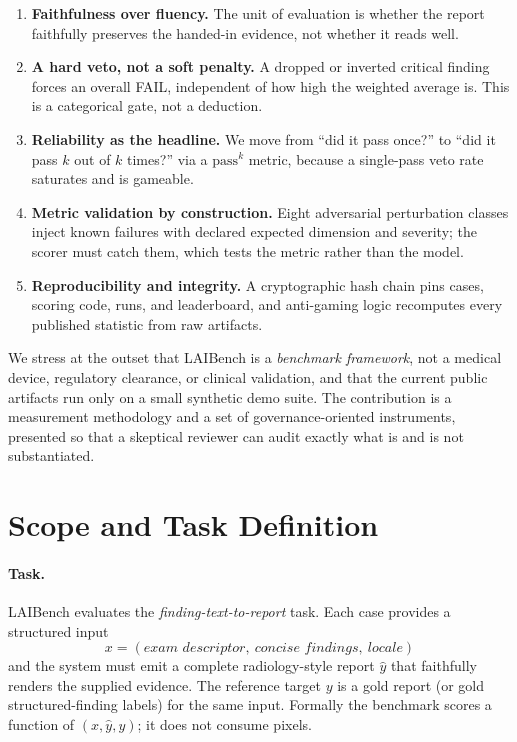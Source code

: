 \documentclass[11pt]{article}
\newcommand{\dimname}[1]{\textsc{#1}}
\newcommand{\passk}{$\mathrm{pass}^{k}$}
\begin{document}
\begin{enumerate}[leftmargin=*]
\item \textbf{Faithfulness over fluency.} The unit of evaluation is whether the
report faithfully preserves the handed-in evidence, not whether it reads well.
\item \textbf{A hard veto, not a soft penalty.} A dropped or inverted critical
finding forces an overall \dimname{FAIL}, independent of how high the weighted
average is. This is a categorical gate, not a deduction.
\item \textbf{Reliability as the headline.} We move from ``did it pass once?'' to
``did it pass $k$ out of $k$ times?'' via a \passk{} metric, because a
single-pass veto rate saturates and is gameable.
\item \textbf{Metric validation by construction.} Eight adversarial perturbation
classes inject known failures with declared expected dimension and severity; the
scorer must catch them, which tests the metric rather than the model.
\item \textbf{Reproducibility and integrity.} A cryptographic hash chain pins
cases, scoring code, runs, and leaderboard, and anti-gaming logic recomputes
every published statistic from raw artifacts.
\end{enumerate}

We stress at the outset that LAIBench is a \emph{benchmark framework}, not a
medical device, regulatory clearance, or clinical validation, and that the
current public artifacts run only on a small synthetic demo suite. The
contribution is a measurement methodology and a set of governance-oriented
instruments, presented so that a skeptical reviewer can audit exactly what is
and is not substantiated.

\section{Scope and Task Definition}
\label{sec:scope}

\paragraph{Task.} LAIBench evaluates the \emph{finding-text-to-report} task.
Each case provides a structured input
\[
x = (\textit{exam descriptor},\ \textit{concise findings},\ \textit{locale})
\]
and the system must emit a complete radiology-style report $\hat{y}$ that
faithfully renders the supplied evidence. The reference target $y$ is a gold
report (or gold structured-finding labels) for the same input. Formally the
benchmark scores a function of $(x, \hat{y}, y)$; it does not consume pixels.
\end{document}
